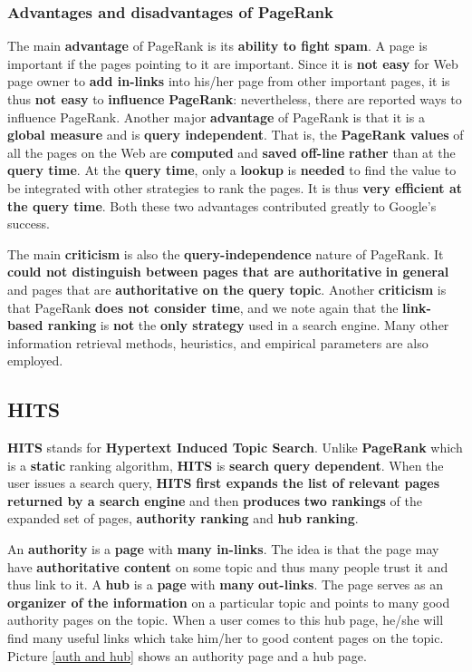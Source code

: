 \subsubsection{Advantages and disadvantages of PageRank}
The main \textbf{advantage} of PageRank is its \textbf{ability to fight spam}. A page is important if the pages pointing to it are important. Since it is \textbf{not easy} for Web page owner to \textbf{add in-links} into his/her page from other important pages, it is thus \textbf{not easy} to \textbf{influence} \textbf{PageRank}: nevertheless, there are reported ways to influence PageRank. Another major \textbf{advantage} of PageRank is that it is a \textbf{global measure} and is \textbf{query independent}. That is, the \textbf{PageRank values} of all the pages on the Web are \textbf{computed} and \textbf{saved} \textbf{off-line} \textbf{rather} than at the \textbf{query time}. At the \textbf{query time}, only a \textbf{lookup} is \textbf{needed} to find the value to be integrated with other strategies to rank the pages. It is thus \textbf{very efficient at the query time}. Both these two advantages contributed greatly to Google’s success. 

The main \textbf{criticism} is also the \textbf{query-independence} nature of PageRank. It \textbf{could not distinguish between pages that are authoritative} \textbf{in general} and pages that are \textbf{authoritative on the query topic}. Another \textbf{criticism} is that PageRank \textbf{does not consider time}, and we note again that the \textbf{link-based ranking} is \textbf{not} the \textbf{only strategy} used in a search engine. Many other information retrieval methods, heuristics, and empirical parameters are also employed. 

\subsection{HITS}
\textbf{HITS} stands for \textbf{Hypertext Induced Topic Search}. Unlike \textbf{PageRank} which is a \textbf{static} ranking algorithm, \textbf{HITS} is \textbf{search query dependent}. When the user issues a search query, \textbf{HITS} \textbf{first expands the list of relevant pages returned by a search engine} and then \textbf{produces} \textbf{two rankings} of the expanded set of pages, \textbf{authority ranking} and \textbf{hub ranking}. 

An \textbf{authority} is a \textbf{page} with \textbf{many in-links}. The idea is that the page may have \textbf{authoritative content} on some topic and thus many people trust it and thus link to it. A \textbf{hub} is a \textbf{page} with \textbf{many} \textbf{out-links}. The page serves as an \textbf{organizer of the information} on a particular topic and points to many good authority pages on the topic. When a user comes to this hub page, he/she will find many useful links which take him/her to good content pages on the topic. Picture \ref{auth and hub} shows an authority page and a hub page. 


